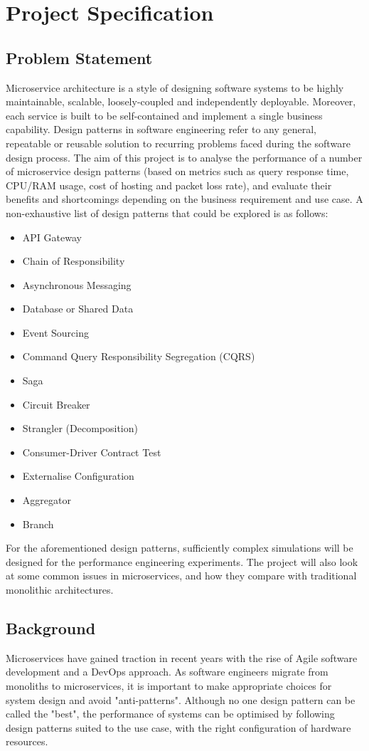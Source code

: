 \chapter{Project Specification}

\section{Problem Statement}
Microservice architecture is a style of designing software systems to be highly maintainable, scalable, loosely-coupled and independently deployable. Moreover, each service is built to be self-contained and implement a single business capability. Design patterns in software engineering refer to any general, repeatable or reusable solution to recurring problems faced during the software design process. The aim of this project is to analyse the performance of a number of microservice design patterns (based on metrics such as query response time, CPU/RAM usage, cost of hosting and packet loss rate), and evaluate their benefits and shortcomings depending on the business requirement and use case. A non-exhaustive list of design patterns that could be explored is as follows:

\begin{itemize}
	\item API Gateway
	\item Chain of Responsibility
	\item Asynchronous Messaging
	\item Database or Shared Data
	\item Event Sourcing
	\item Command Query Responsibility Segregation (CQRS)
	\item Saga
	\item Circuit Breaker
	\item Strangler (Decomposition)
	\item Consumer-Driver Contract Test
	\item Externalise Configuration
	\item Aggregator
	\item Branch
\end{itemize}

For the aforementioned design patterns, sufficiently complex simulations will be designed for the performance engineering experiments. The project will also look at some common issues in microservices, and how they compare with traditional monolithic architectures.

\pagebreak
\section{Background}
Microservices have gained traction in recent years with the rise of Agile software development and a DevOps \cite{awsDevOps} approach. As software engineers migrate from monoliths to microservices, it is important to make appropriate choices for system design and avoid "anti-patterns". Although no one design pattern can be called the "best", the performance of systems can be optimised by following design patterns suited to the use case, with the right configuration of hardware resources.

